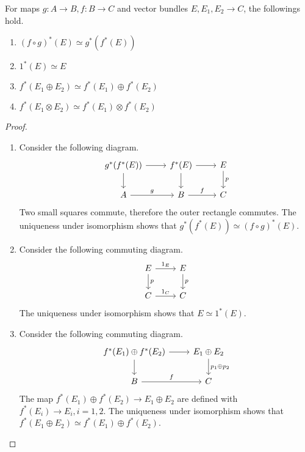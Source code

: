 \begin{prop} For maps $g:A\rightarrow B, f:B\rightarrow C$ and vector bundles $E,E_1,E_2\rightarrow C$, the followings hold.
\begin{enumerate}
    \item $(f\circ g)^*(E)\simeq g^*(f^*(E))$
    \item $1^*(E)\simeq E$
    \item $f^*(E_1\oplus E_2)\simeq f^*(E_1)\oplus f^*(E_2)$
    \item $f^*(E_1\otimes E_2)\simeq f^*(E_1)\otimes f^*(E_2)$
\end{enumerate}
\end{prop}
\begin{proof}
~\begin{enumerate}
    \item Consider the following diagram.
    \begin{equation}
        \begin{tikzcd}
        g^*(f^*(E))\arrow[r]\arrow[d]& f^*(E)\arrow[r]\arrow[d] &E\arrow{d}{p}\\
        A\arrow{r}{g}&B\arrow{r}{f}&C
        \end{tikzcd}
    \end{equation}
    Two small squares commute, therefore the outer rectangle commutes. The uniqueness under isomorphism shows that $g^*(f^*(E))\simeq (f\circ g)^*(E)$.
    \item Consider the following commuting diagram.
    \begin{equation}
        \begin{tikzcd}
        E\arrow{r}{1_E}\arrow{d}{p} &E\arrow{d}{p}\\
        C\arrow{r}{1_C}&C
        \end{tikzcd}
    \end{equation}
    The uniqueness under isomorphism shows that $E\simeq 1^*(E)$.
    \item Consider the following commuting diagram.
    \begin{equation}
        \begin{tikzcd}
        f^*(E_1)\oplus f^*(E_2)\arrow[r]\arrow[d] &E_1\oplus E_2\arrow{d}{p_1\oplus p_2}\\
        B\arrow{r}{f}&C
        \end{tikzcd}
    \end{equation}
    The map $f^*(E_1)\oplus f^*(E_2)\rightarrow E_1\oplus E_2$ are defined with $f^*(E_i)\rightarrow E_i,i=1,2$. The uniqueness under isomorphism shows that $f^*(E_1\oplus E_2)\simeq f^*(E_1)\oplus f^*(E_2)$.

\end{enumerate}
\end{proof}

